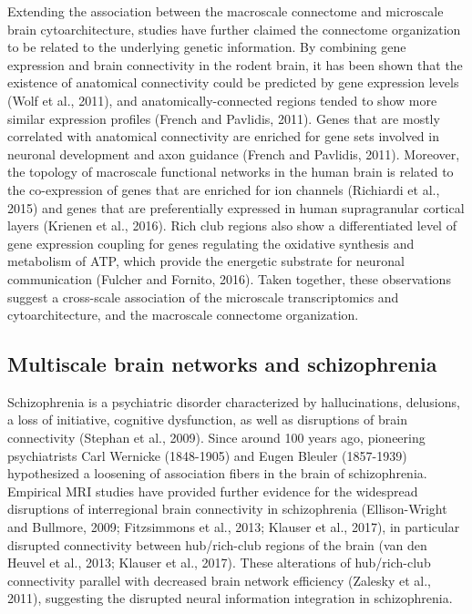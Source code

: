 \begin{refsection}
Extending the association between the macroscale connectome and microscale brain cytoarchitecture, studies have further claimed the connectome organization to be related to the underlying genetic information. By combining gene expression and brain connectivity in the rodent brain, it has been shown that the existence of anatomical connectivity could be predicted by gene expression levels (Wolf et al., 2011), and anatomically-connected regions tended to show more similar expression profiles (French and Pavlidis, 2011). Genes that are mostly correlated with anatomical connectivity are enriched for gene sets involved in neuronal development and axon guidance (French and Pavlidis, 2011). Moreover, the topology of macroscale functional networks in the human brain is related to the co-expression of genes that are enriched for ion channels (Richiardi et al., 2015) and genes that are preferentially expressed in human supragranular cortical layers (Krienen et al., 2016). Rich club regions also show a differentiated level of gene expression coupling for genes regulating the oxidative synthesis and metabolism of ATP, which provide the energetic substrate for neuronal communication (Fulcher and Fornito, 2016). Taken together, these observations suggest a cross-scale association of the microscale transcriptomics and cytoarchitecture, and the macroscale connectome organization.

\subsection*{Multiscale brain networks and schizophrenia}
Schizophrenia is a psychiatric disorder characterized by hallucinations, delusions, a loss of initiative, cognitive dysfunction, as well as disruptions of brain connectivity (Stephan et al., 2009). Since around 100 years ago, pioneering psychiatrists Carl Wernicke (1848-1905) and Eugen Bleuler (1857-1939) hypothesized a loosening of association fibers in the brain of schizophrenia. Empirical MRI studies have provided further evidence for the widespread disruptions of interregional brain connectivity in schizophrenia (Ellison-Wright and Bullmore, 2009; Fitzsimmons et al., 2013; Klauser et al., 2017), in particular disrupted connectivity between hub/rich-club regions of the brain (van den Heuvel et al., 2013; Klauser et al., 2017). These alterations of hub/rich-club connectivity parallel with decreased brain network efficiency (Zalesky et al., 2011), suggesting the disrupted neural information integration in schizophrenia.


\end{refsection}
